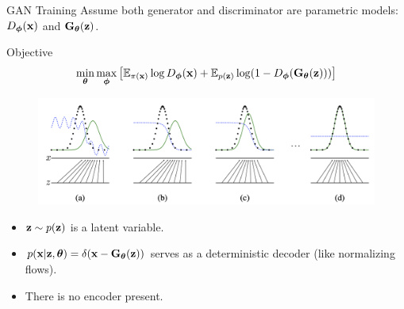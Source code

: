 \documentclass{beamer}
\begin{document}
\begin{frame}{GAN Training}
	Assume both generator and discriminator are parametric models: $D_{\boldsymbol{\phi}}(\mathbf{x})$ and $\mathbf{G}_{\boldsymbol{\theta}}(\mathbf{z})$.
	\begin{block}{Objective}
		\vspace{-0.7cm}
		\[
		\min_{\boldsymbol{\theta}} \max_{\boldsymbol{\phi}} \left[ \mathbb{E}_{\pi(\mathbf{x})} \log D_{\boldsymbol{\phi}}(\mathbf{x}) + \mathbb{E}_{p(\mathbf{z})} \log (1 - D_{\boldsymbol{\phi}}(\mathbf{G}_{\boldsymbol{\theta}}(\mathbf{z}))) \right]
		\]
		\vspace{-0.7cm}
	\end{block}
	\begin{figure}
		\centering
		\includegraphics[width=1.0\linewidth]{figs/gan_1}
	\end{figure}

	\begin{itemize}
		\item $\mathbf{z} \sim p(\mathbf{z})$ is a latent variable.
		\item $p(\mathbf{x} | \mathbf{z}, \boldsymbol{\theta}) = \delta(\mathbf{x} - \mathbf{G}_{\boldsymbol{\theta}}(\mathbf{z}))$ serves as a deterministic decoder ({\color{gray}like normalizing flows}).
		\item There is no encoder present.
	\end{itemize}

\end{frame}
\end{document}
